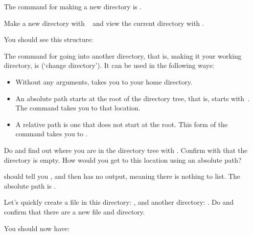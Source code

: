 
The command for making a new directory is .

\begin{exercise}
  Make a new directory with ~ and view
  the current directory with .
\end{exercise}
\begin{outcome}
  You should see this structure:
\end{outcome}

The command for going into another directory, that is, making it your
working directory, is  (`change directory'). It can be used in
the following ways:
\begin{itemize}
\item {} Without any arguments,  takes you to your home directory.
\item {} An absolute path starts at the root of
  the directory tree, that is, starts with~\n{/}. The  command
  takes you to that location.
\item {} A relative path is one that does not
  start at the root. This form of the  command takes you to
  .
\end{itemize}

\begin{exercise}
  Do  and find out where you are in the directory tree
  with .  Confirm with  that the directory is empty.  How
  would you get to this location using an absolute path?
\end{exercise}
\begin{outcome}
   should tell you , and  then has no
  output, meaning there is nothing to list.  The absolute path is
  .
\end{outcome}

\begin{exercise}
  Let's quickly create a file in this directory: 
  , and another directory: .  Do 
  and confirm that there are a new file and directory.
\end{exercise}
\begin{outcome}
  You should now have: 
\end{outcome}

